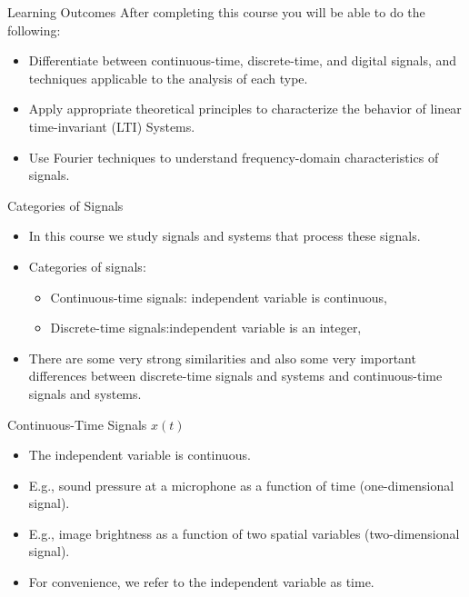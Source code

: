 \begin{frame}{Learning Outcomes}
    After completing this course you will be able to do the following:
    \begin{itemize}[<+->]
        \item Differentiate between continuous-time, discrete-time, and digital signals, and techniques applicable to the analysis of each type.
        \item Apply appropriate theoretical principles to characterize the behavior of linear time-invariant (LTI) Systems.
        \item Use Fourier techniques to understand frequency-domain characteristics of signals.
    \end{itemize}
\end{frame}


\begin{frame}{Categories of Signals}
    \begin{itemize}[<+->]
        \item In this course we study signals and systems that process these signals.
        \item Categories of signals:
            \begin{itemize}
                \item Continuous-time signals: independent variable is continuous, 
                \item Discrete-time signals:independent variable is an integer,  
            \end{itemize}
        \item There are some very strong similarities and also some very important differences between discrete-time signals and systems and continuous-time signals and systems.
    \end{itemize}
\end{frame}


\begin{frame}{Continuous-Time Signals $x(t)$}
    \begin{itemize}
        \item The independent variable is continuous.
        \item E.g., sound pressure at a microphone as a function of time (one-dimensional signal).
        \item E.g., image brightness as a function of two spatial variables (two-dimensional signal).
        \item For convenience, we refer to the independent variable as time.
    \end{itemize}
\end{frame}

